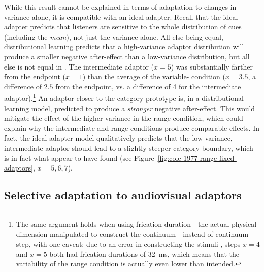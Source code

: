 \label{r2-whole-distribution-3}
While this result cannot be explained in terms of adaptation to changes in variance alone, it is compatible with an ideal adapter.  Recall that the ideal adapter predicts that listeners are sensitive to the whole distribution of cues (including the \emph{mean}), not just the variance alone.  All else being equal, distributional learning predicts that a high-variance adaptor distribution will produce a smaller negative after-effect than a low-variance distribution, but all else is not equal in \textcite{Cole1977}.  The intermediate  adaptor ($x=5$) was substantially farther from the  endpoint ($x=1$) than the average of the variable- condition ($\bar x = 3.5$, a difference of $2.5$ from the endpoint, vs. a difference of 4 for the intermediate adaptor).\footnote{The same argument holds when using frication duration---the actual physical dimension manipulated to construct the continuum---instead of continuum step, with one caveat: due to an error in constructing the stimuli \autocite[Footnote 1]{Cole1977}, steps $x=4$ and $x=5$ both had frication durations of \SI{32}{\milli\second}, which means that the variability of the range condition is actually even lower than intended.}  An adaptor closer to the category prototype is, in a distributional learning model, predicted to produce a \emph{stronger} negative after-effect.  This would mitigate the effect of the higher variance in the range condition, which could explain why the intermediate and range conditions produce comparable effects.  In fact, the ideal adapter model qualitatively predicts that the low-variance, intermediate adaptor should lead to a slightly steeper category boundary, which is in fact what \textcite{Cole1977} appear to have found (see Figure~\ref{fig:cole-1977-range-fixed-adaptors}, $x=5,6,7$).


\subsection{Selective adaptation to audiovisual adaptors}
\label{sec:select-adapt-audi}

